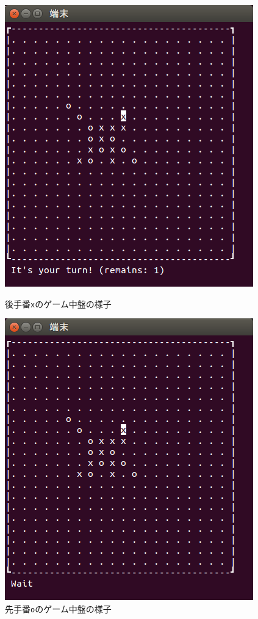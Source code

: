 \documentclass[a4j, titlepage, 10pt]{jsarticle}
\newcommand{\code}[1]{\texttt{#1}}
\begin{document}
\begin{figure}[H]
  \begin{minipage}{0.5\hsize}
    \centering
    \includegraphics[scale=0.5]{img/fin-prev1-1.png}
    \caption{後手番\code{x}のゲーム中盤の様子}
    \label{fig:fin-prev1-1.png}
  \end{minipage}
  \begin{minipage}{0.5\hsize}
    \includegraphics[scale=0.5]{img/fin-prev1-2.png}
    \caption{先手番\code{o}のゲーム中盤の様子}
    \label{fig:fin-prev1-2.png}
  \end{minipage}
\end{figure}
\end{document}
